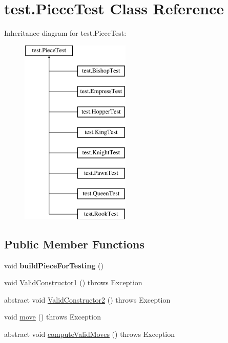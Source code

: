 \hypertarget{classtest_1_1_piece_test}{}\section{test.\+Piece\+Test Class Reference}
\label{classtest_1_1_piece_test}
Inheritance diagram for test.\+Piece\+Test\+:\begin{figure}[H]
\begin{center}
\leavevmode
\includegraphics[height=9.000000cm]{classtest_1_1_piece_test}
\end{center}
\end{figure}
\subsection*{Public Member Functions}
\begin{DoxyCompactItemize}
\item 
\mbox{\label{classtest_1_1_piece_test_a334090be857c7b0085466dd784768748}} 
void {\bfseries build\+Piece\+For\+Testing} ()
\item 
void \mbox{\hyperlink{classtest_1_1_piece_test_a4680ac39911c714af4402657d7b5a3e2}{Valid\+Constructor1}} ()  throws Exception 
\item 
abstract void \mbox{\hyperlink{classtest_1_1_piece_test_a3c841ee578a23ea6162afd09e09434cd}{Valid\+Constructor2}} ()  throws Exception
\item 
void \mbox{\hyperlink{classtest_1_1_piece_test_aaf5df7af55f8bbcb89bd2554b1876709}{move}} ()  throws Exception 
\item 
abstract void \mbox{\hyperlink{classtest_1_1_piece_test_a8d83b20ef3c6fe8d2acd692b8dedb551}{compute\+Valid\+Moves}} ()  throws Exception
\end{DoxyCompactItemize}
